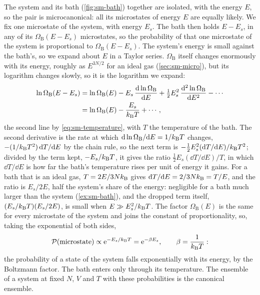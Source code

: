 The system and its bath (\cref{fig:sm-bath}) together are isolated, with
the energy $E$, so the pair is microcanonical: all its microstates of
energy $E$ are equally likely. We fix one microstate of the system, with
energy $E_s$. The bath then holds $E - E_s$, in any of its
$\Omega_{\mathrm B}(E - E_s)$ microstates, so the probability of that one
microstate of the system is proportional to $\Omega_{\mathrm B}(E - E_s)$.
The system's energy is small against the bath's, so we expand about $E$
in a Taylor series. $\Omega_{\mathrm B}$ itself changes enormously with its
energy, roughly as $E^{3N/2}$ for an ideal gas (\cref{sec:sm-micro}), but
its logarithm changes slowly, so it is the logarithm we expand:
\begin{align*}
   \ln\Omega_{\mathrm B}(E - E_s) &= \ln\Omega_{\mathrm B}(E)
   - E_s\,\frac{\mathrm{d}\ln\Omega_{\mathrm B}}{\mathrm{d} E}
   + \tfrac12E_s^2\,\frac{\mathrm{d}^2\ln\Omega_{\mathrm B}}{\mathrm{d} E^2} - \dotsb\\
   &= \ln\Omega_{\mathrm B}(E) - \frac{E_s}{k_{\mathrm{B}} T} + \dotsb ,
\end{align*}
the second line by \cref{eq:sm-temperature}, with $T$ the temperature of
the bath. The second derivative is the rate
at which $\mathrm{d}\ln\Omega_{\mathrm B}/\mathrm{d} E = 1/k_{\mathrm{B}} T$ changes, $-(1/k_{\mathrm{B}}
T^2)\,\mathrm{d} T/\mathrm{d} E$ by the chain rule, so the next term is
$-\frac12E_s^2(\mathrm{d} T/\mathrm{d} E)/k_{\mathrm{B}} T^2$; divided by the term kept,
$-E_s/k_{\mathrm{B}} T$, it gives the ratio $\frac12E_s(\dd T/\dd E)/T$, in which
$\dd T/\dd E$ is how far the bath's temperature rises per unit of energy
it gains. For a bath that is an ideal gas, $T = 2E/3Nk_{\mathrm{B}}$ gives $\mathrm{d}
T/\mathrm{d} E = 2/3Nk_{\mathrm{B}} = T/E$, and the ratio is $E_s/2E$, half the system's
share of the energy: negligible for a bath much larger than the system
(\cref{ex:sm-bath}), and the dropped term itself, $(E_s/k_{\mathrm{B}} T)(E_s/2E)$,
is small when $E \gg E_s^2/k_{\mathrm{B}} T$. The factor $\Omega_{\mathrm B}(E)$ is the same for
every microstate of the system and joins the constant of proportionality,
so, taking the exponential of both sides,
\begin{equation}
   \mathcal{P}(\text{microstate}) \propto \mathrm{e}^{-E_s/k_{\mathrm{B}} T}
   = \mathrm{e}^{-\beta E_s} , \qquad \beta = \frac{1}{k_{\mathrm{B}} T} :
   \label{eq:sm-boltzmann}
\end{equation}
the probability of a state of the system falls exponentially with its
energy, by the Boltzmann factor. The bath enters only through its
temperature. The ensemble of a system at fixed $N$, $V$ and $T$ with these
probabilities is the canonical ensemble.

